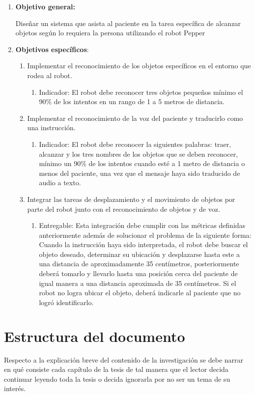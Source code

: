 \begin{enumerate}
    \item{\textbf{Objetivo general:}} 
    
    Diseñar un sistema que asista al paciente en la tarea específica de alcanzar objetos según lo requiera la persona utilizando el robot Pepper
    \item{\textbf{Objetivos específicos}}:
    \begin{enumerate}
    \item Implementar el reconocimiento de los objetos específicos en el entorno que rodea al robot.
        \begin{enumerate}
            \item Indicador: El robot debe reconocer tres objetos pequeños mínimo el 90\% de los intentos en un rango de 1 a 5 metros de distancia.
        \end{enumerate}
    
        \item Implementar el reconocimiento de la voz del paciente y traducirlo como una instrucción.
        \begin{enumerate}
            \item Indicador: El robot debe reconocer la siguientes palabras: traer, alcanzar y los tres nombres de los objetos que se deben reconocer, mínimo un 90\% de los intentos cuando esté a 1 metro de distancia o menos del paciente, una vez que el mensaje haya sido traducido de audio a texto.
        \end{enumerate}
        
        \item Integrar las tareas de desplazamiento y el movimiento de objetos por parte del robot junto con el reconocimiento de objetos y de voz. 
        \begin{enumerate}
            \item Entregable: Esta integración debe cumplir con las métricas definidas anteriormente además de solucionar el problema de la siguiente forma: Cuando la instrucción haya sido interpretada, el robot debe buscar el objeto deseado, determinar su ubicación y desplazarse hasta este a una distancia de aproximadamente 35 centímetros, posteriormente deberá tomarlo y llevarlo hasta una posición cerca del paciente de igual manera a una distancia aproximada de 35 centímetros. Si el robot no logra ubicar el objeto, deberá indicarle al paciente que no logró identificarlo.
            
        \end{enumerate}
    \end{enumerate}
\end{enumerate}




\section{Estructura del documento}









Respecto a la explicación breve del contenido de la investigación se debe narrar en qué consiste cada capítulo de la tesis de tal manera que el lector decida continuar leyendo toda la tesis o decida ignorarla por no ser un tema de su interés.
